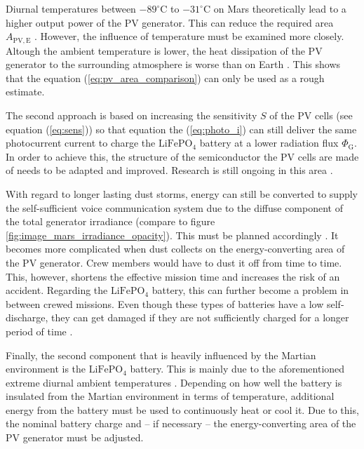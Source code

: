 Diurnal temperatures between $-89^\circ \mathrm{C}$ to $-31^\circ \mathrm{C}$ on Mars theoretically lead to a higher output power of the PV generator. This can reduce the required area $A_{\mathrm{PV,E}}$ \cite{Mertens:2015, Grayzeck:2020}. However, the influence of temperature must be examined more closely. Altough the ambient temperature is lower, the heat dissipation of the PV generator to the surrounding atmosphere is worse than on Earth \cite{Kemmetmuller:2021}. This shows that the equation (\ref{eq:pv_area_comparison}) can only be used as a rough estimate.

The second approach is based on increasing the sensitivity $S$ of the PV cells (see equation (\ref{eq:sens})) so that equation the (\ref{eq:photo_i}) can still deliver the same photocurrent current to charge the $\mathrm{LiFePO}_4$ battery at a lower radiation flux $\Phi_\mathrm{G}$. In order to achieve this, the structure of the semiconductor the PV cells are made of needs to be adapted and improved. Research is still ongoing in this area \cite{Mertens:2015}.  

With regard to longer lasting dust storms, energy can still be converted to supply the self-sufficient voice communication system due to the diffuse component of the total generator irradiance (compare to figure \ref{fig:image_mars_irradiance_opacity}). This must be planned accordingly \cite{Appelbaum:1990, Appelbaum:1992, Landis:1995, Mertens:2015}. It becomes more complicated when dust collects on the energy-converting area of the PV generator. Crew members would have to dust it off from time to time. This, however, shortens the effective mission time and increases the risk of an accident. Regarding the $\mathrm{LiFePO}_4$ battery, this can further become a problem in between crewed missions. Even though these types of batteries have a low self-discharge, they can get damaged if they are not sufficiently charged for a longer period of time \cite{Offgridtec:2020}.

Finally, the second component that is heavily influenced by the Martian environment is the $\mathrm{LiFePO}_4$ battery. This is mainly due to the aforementioned extreme diurnal ambient temperatures \cite{Hausmann:2013, Wehbe:2015, Ala-A.-Hussein:2015, Nejad:2016, Chin:2018, Grayzeck:2020}. Depending on how well the battery is insulated from the Martian environment in terms of temperature, additional energy from the battery must be used to continuously heat or cool it. Due to this, the nominal battery charge and -- if necessary -- the energy-converting area of the PV generator must be adjusted. 
